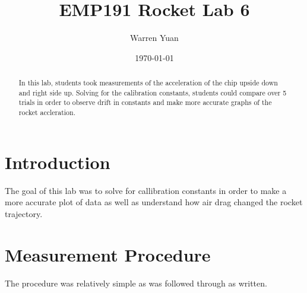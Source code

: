 \documentclass[a4paper,11pt]{article}
\title{\vspace{-2.0cm}EMP191 Rocket Lab 6}
\author{Warren Yuan}
\date{\today}
\begin{document}
\maketitle

\begin{abstract}
    In this lab, students took measurements of the acceleration of the chip upside down and right side up. Solving for the calibration constants, students could compare over 5 trials in order to observe drift in constants and make more accurate graphs of the rocket accleration.
\end{abstract}

\section{Introduction}
{\quad The goal of this lab was to solve for callibration constants in order to make a more accurate plot of data as well as understand how air drag changed the rocket trajectory.}

\section{Measurement Procedure}
{\quad The procedure was relatively simple as was followed through as written.}
\end{document}

